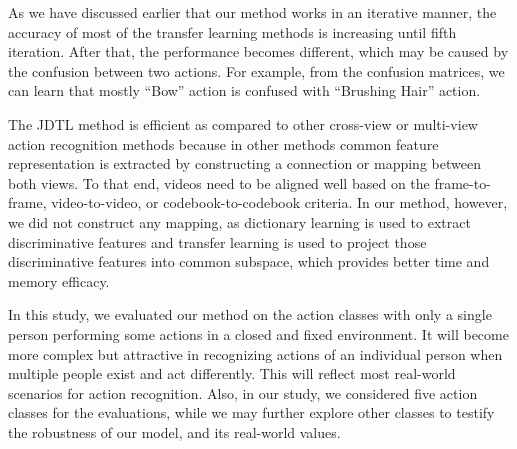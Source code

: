 As we have discussed earlier that our method works in an iterative manner, the accuracy of most of the transfer learning methods is increasing until fifth iteration. After that, the performance becomes different, which may be caused by the confusion between two actions. For example, from the confusion matrices, we can learn that mostly \enquote{Bow} action is confused with \enquote{Brushing Hair} action.

The JDTL method is efficient as compared to other cross-view or multi-view action recognition methods because in other methods common feature representation is extracted by constructing a connection or mapping between both views. To that end, videos need to be aligned well based on the frame-to-frame, video-to-video, or codebook-to-codebook criteria. In our method, however, we did not construct any mapping, as dictionary learning is used to extract discriminative features and transfer learning is used to project those discriminative features into common subspace, which provides better time and memory efficacy.

In this study, we evaluated our method on the action classes with only a single person performing some actions in a closed and fixed environment. It will become more complex but attractive in recognizing actions of an individual person when multiple people exist and act differently. This will reflect most real-world scenarios for action recognition. Also, in our study, we considered five action classes for the evaluations, while we may further explore other classes to testify the robustness of our model, and its real-world values.


